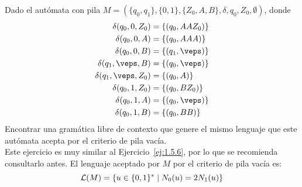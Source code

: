\begin{ejercicio}\label{ej:1.5.13}
    Dado el autómata con pila $M = (\{q_0,q_1\},\{0,1\},\{Z_0,A,B\},\delta,q_0,Z_0,\emptyset )$, donde
    \begin{align*}
        \delta(q_0,0,Z_0) &= \{(q_0,AAZ_0)\}\\
        \delta(q_0,0,A) &= \{(q_0,AAA)\}\\
        \delta(q_0,0,B) &= \{(q_1,\veps)\}\\
        \delta(q_1,\veps,B) &= \{(q_0,\veps)\}\\
        \delta(q_1,\veps,Z_0) &= \{(q_0,A)\}\\
        \delta(q_0,1,Z_0) &= \{(q_0,BZ_0)\}\\
        \delta(q_0,1,A) &= \{(q_0,\veps)\}\\
        \delta(q_0,1,B) &= \{(q_0,BB)\}
    \end{align*}
    Encontrar una gramática libre de contexto que genere el mismo lenguaje que este autómata acepta por el criterio de pila vacía.\\

    Este ejercicio es muy similar al Ejercicio~\ref{ej:1.5.6}, por lo que se recomienda consultarlo antes. El lenguaje aceptado por $M$ por el criterio de pila vacía es:
    \begin{equation*}
        \mathcal{L}(M)=\{u\in \{0,1\}^\ast \mid N_0(u) = 2N_1(u)\}
    \end{equation*}

\end{ejercicio}

